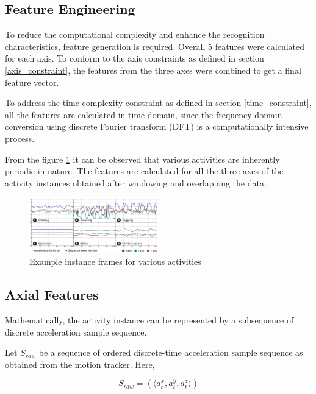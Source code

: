 \documentclass[5p]{elsarticle}
\begin{document}
\subsection{Feature Engineering}
To reduce the computational complexity and enhance the recognition characteristics, feature generation is required. Overall 5 features were calculated for each axis. To conform to the axis constraints as defined in section \ref{axis_constraint}, the features from the three axes were combined to get a final feature vector.

To address the time complexity constraint as defined in section \ref{time_constraint}, all the features are calculated in time domain, since the frequency domain conversion using discrete Fourier transform (\gls{DFT}) is a computationally intensive process.

From the figure \ref{example_activity_instance} it can be observed that various activities are inherently periodic in nature. The features are calculated for all the three axes of the activity instances obtained after windowing and overlapping the data.

\begin{figure}[h!]
  \begin{center}
    \includegraphics[width=0.5\textwidth]{example_activity_instance}
  \end{center}
  \vspace{-10pt}
  \caption{\label{example_activity_instance}Example instance frames for various activities}
\end{figure}


\subsection{Axial Features}
\label{axial_feature}
Mathematically, the activity instance can be represented by a subsequence of discrete acceleration sample sequence.

Let $S_{raw}$ be a sequence of ordered discrete-time acceleration sample sequence as obtained from the motion tracker. Here, 

\begin{equation} \label{eq:s_raw}
S_{raw}=(\langle a^x_t,a^y_t,a^z_t \rangle)
\end{equation}
\end{document}
